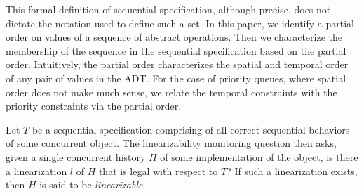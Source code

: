 This formal definition of sequential specification, although precise, does not dictate the notation used to define such a set. In this paper, we identify a partial order on values of a sequence of abstract operations. Then we characterize the membership of the sequence in the sequential specification based on the partial order. Intuitively, the partial order characterizes the spatial and temporal order of any pair of values in the ADT. For the case of priority queues, where spatial order does not make much sense, we relate the temporal constraints with the priority constraints via the partial order.

\begin{problem*}
Let $T$ be a sequential specification comprising of all correct sequential behaviors of some concurrent object. The linearizability monitoring question then asks, given a single concurrent history $H$ of some implementation of the object, is there a linearization $l$ of $H$ that is legal with respect to $T$?
If such a linearization exists, then $H$ is said to be \emph{linearizable}.
\end{problem*}